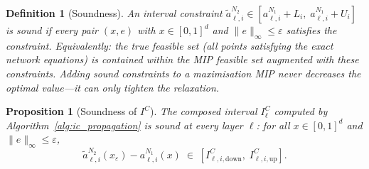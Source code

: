 \documentclass[11pt]{article}
\newcommand{\eps}{\varepsilon}
\newcommand{\layerl}{\ell}
\newtheorem{proposition}{Proposition}
\newtheorem{definition}{Definition}
\begin{document}
\begin{definition}[Soundness]
An interval constraint $\tilde{a}^{N_2}_{\layerl,i} \in [a^{N_1}_{\layerl,i} + L_i,\; a^{N_1}_{\layerl,i} + U_i]$
is \emph{sound} if every pair $(x, e)$ with $x \in [0,1]^d$ and $\|e\|_\infty \le \eps$
satisfies the constraint.
Equivalently: the true feasible set (all points satisfying the exact network
equations) is contained within the MIP feasible set augmented with these
constraints.
Adding sound constraints to a maximisation MIP never decreases the optimal
value---it can only tighten the relaxation.
\end{definition}

\begin{proposition}[Soundness of $I^C$]
\label{thm:soundness}
The composed interval $I^C_\layerl$ computed by Algorithm~\ref{alg:ic_propagation}
is sound at every layer $\layerl$: for all $x \in [0,1]^d$ and $\|e\|_\infty \le \eps$,
\begin{equation}
    \tilde{a}^{N_2}_{\layerl,i}(x_\varepsilon) - a^{N_1}_{\layerl,i}(x)
    \;\in\;
    [I^C_{\layerl,i,\mathrm{down}},\; I^C_{\layerl,i,\mathrm{up}}].
\end{equation}
\end{proposition}
\end{document}
